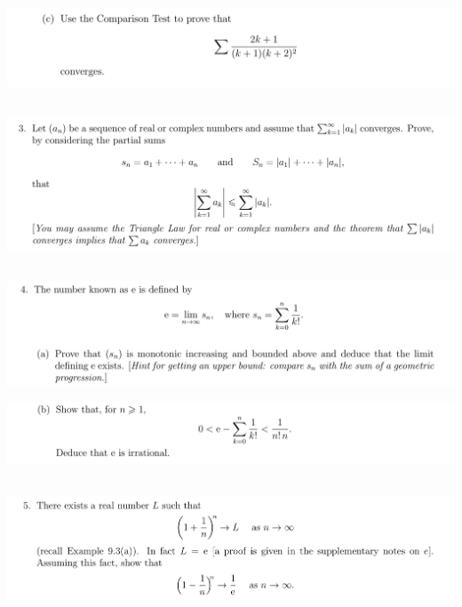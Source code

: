 \documentclass[12pt]{article}
\begin{document}
\begin{mdframed}
\includegraphics[width=400pt]{img/analysis--oxford-M2-I-5-2-c.png}
\end{mdframed}

\subsection{}
\begin{mdframed}
\includegraphics[width=400pt]{img/analysis--oxford-M2-I-5-3.png}
\end{mdframed}

\newpage
\subsection{}
\begin{mdframed}
\includegraphics[width=400pt]{img/analysis--oxford-M2-I-5-4-a.png}
\end{mdframed}

\begin{mdframed}
\includegraphics[width=400pt]{img/analysis--oxford-M2-I-5-4-b.png}
\end{mdframed}

\newpage
\subsection{}
\begin{mdframed}
\includegraphics[width=400pt]{img/analysis--oxford-M2-I-5-5.png}
\end{mdframed}
\end{document}
